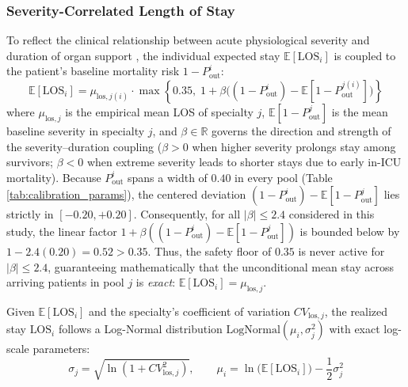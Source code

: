 \documentclass[final,5p,times,twocolumn]{elsarticle}
\begin{document}
\subsubsection{Severity-Correlated Length of Stay}
To reflect the clinical relationship between acute physiological severity and duration of organ support \cite{zampieri2019icu, soares2024update}, the individual expected stay $\mathbb{E}[\text{LOS}_i]$ is coupled to the patient's baseline mortality risk $1 - P_{\text{out}}^i$:
\begin{equation}
    \mathbb{E}[\text{LOS}_i] = \mu_{\text{los}, j(i)} \cdot \max\!\left\{ 0.35,\; 1 + \beta \Big( (1 - P_{\text{out}}^i) - \mathbb{E}[1 - P_{\text{out}}^{j(i)}] \Big) \right\}
    \label{eq:sev_los}
\end{equation}
where $\mu_{\text{los}, j}$ is the empirical mean LOS of specialty $j$, $\mathbb{E}[1 - P_{\text{out}}^j]$ is the mean baseline severity in specialty $j$, and $\beta \in \mathbb{R}$ governs the direction and strength of the severity--duration coupling ($\beta > 0$ when higher severity prolongs stay among survivors; $\beta < 0$ when extreme severity leads to shorter stays due to early in-ICU mortality). Because $P_{\text{out}}^i$ spans a width of $0.40$ in every pool (Table \ref{tab:calibration_params}), the centered deviation $(1 - P_{\text{out}}^i) - \mathbb{E}[1 - P_{\text{out}}^j]$ lies strictly in $[-0.20, +0.20]$. Consequently, for all $|\beta| \le 2.4$ considered in this study, the linear factor $1 + \beta((1 - P_{\text{out}}^i) - \mathbb{E}[1 - P_{\text{out}}^j])$ is bounded below by $1 - 2.4(0.20) = 0.52 > 0.35$. Thus, the safety floor of $0.35$ is never active for $|\beta| \le 2.4$, guaranteeing mathematically that the unconditional mean stay across arriving patients in pool $j$ is \textit{exact}: $\mathbb{E}[\text{LOS}_i] = \mu_{\text{los}, j}$.

Given $\mathbb{E}[\text{LOS}_i]$ and the specialty's coefficient of variation $CV_{\text{los}, j}$, the realized stay $\text{LOS}_i$ follows a Log-Normal distribution $\text{LogNormal}(\mu_i, \sigma_{j}^2)$ with exact log-scale parameters:
\begin{equation}
    \sigma_{j} = \sqrt{\ln\!\left(1 + CV_{\text{los}, j}^2\right)}, \qquad \mu_i = \ln\!\big(\mathbb{E}[\text{LOS}_i]\big) - \frac{1}{2}\sigma_{j}^2
    \label{eq:lognormal_params}
\end{equation}
\end{document}
